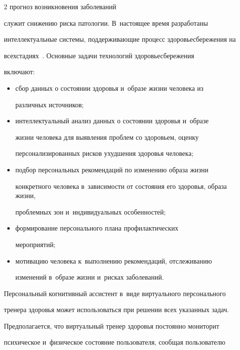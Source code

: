 \begin{multicols}{2}
 прогноз возникновения заболеваний 


служит снижению риска патологии. В~настоящее время разработаны 


интеллектуальные системы, под\-дер\-жи\-вающие процесс здоровьесбережения на 


всех\linebreak стадиях~\cite{14-sm}. Основные задачи технологий здоровьесбережения 


включают: 


  \begin{itemize}


  \item [(а)] сбор данных о состоянии здоровья и~образе жизни человека из 


различных источников;


  \item[(б)] интеллектуальный анализ данных о состоянии здоровья и~образе 


жизни человека для выявления проблем со здоровьем, оценку 


персонализированных рисков ухудшения здоровья человека;


  \item[(в)] подбор персональных рекомендаций по изменению образа жизни 


конкретного человека в~зависимости от состояния его здоровья, образа жизни, 


проблемных зон и~индивидуальных особенностей;


  \item[(г)] формирование персонального плана профилактических 


мероприятий;


  \item[(д)] мотивацию человека к~выполнению рекомендаций, отслеживанию 


изменений в~образе жизни и~рисках заболеваний.


  \end{itemize}


  


  Персональный когнитивный ассистент в~виде виртуального персонального 


тренера здоровья может использоваться при решении всех указанных задач. 


Предполагается, что виртуальный тренер здоровья постоянно мониторит 


психическое и~физическое состояние пользователя, сообщая пользователю 



\end{multicols}
